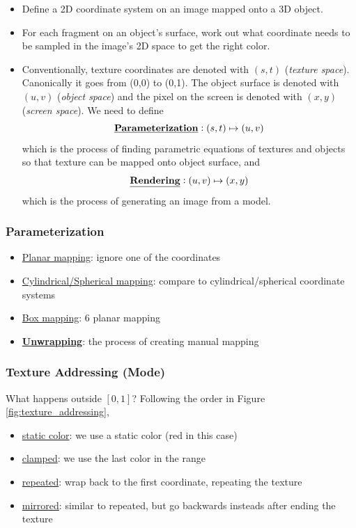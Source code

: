 \documentclass[twocolumn,landscape,10pt]{article}
\theoremstyle{definition}
\begin{document}
\begin{itemize}
    \item Define a 2D coordinate system on an image mapped onto a 3D object.
    \item For each fragment on an object's surface, work out what coordinate 
        needs to be sampled in the image's 2D space to get the right color.
    \item Conventionally, texture coordinates are denoted with $(s,t)$ 
        (\emph{texture space}). Canonically it goes from (0,0) to (0,1).
        The object surface is denoted with $(u,v)$ (\emph{object space}) 
        and the pixel on the screen is denoted with $(x,y)$ (\emph{screen space}).
        We need to define
        \[
            \text{\underline{\textbf{Parameterization}}}:(s,t)\mapsto(u,v)
        \]
        which is the process of finding parametric equations of textures and
        objects so that texture can be mapped onto object surface, and
        \[
            \text{\underline{\textbf{Rendering}}}:(u,v)\mapsto(x,y)
        \]
        which is the process of generating an image from a model.
\end{itemize} 

\subsubsection{Parameterization}

\begin{itemize}
    \item \underline{Planar mapping}: ignore one of the coordinates
    \item \underline{Cylindrical/Spherical mapping}: compare to
        cylindrical/spherical coordinate systems
    \item \underline{Box mapping}: 6 planar mapping
    \item \underline{\textbf{Unwrapping}}: the process of creating manual
        mapping
\end{itemize} 

\subsubsection{Texture Addressing (Mode)}

What happens outside $[0,1]$?
Following the order in Figure \ref{fig:texture_addressing},
\begin{itemize}
    \item \underline{static color}: we use a static color
        (red in this case)
    \item \underline{clamped}: we use the last color in the range
    \item \underline{repeated}: wrap back to the first coordinate, repeating the
        texture
    \item \underline{mirrored}: similar to repeated, but go backwards insteads
        after ending the texture
\end{itemize} 
\end{document}
